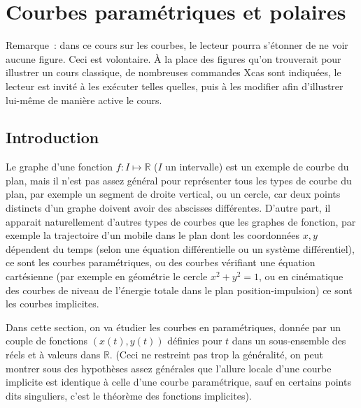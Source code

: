 \documentclass[a4paper,11pt]{article}
\newcommand{\R}{{\mathbb{R}}}
\begin{document}
\section{Courbes param\'etriques et polaires} \label{sec:courbes}
Remarque~: dans ce cours sur les courbes, le lecteur
pourra s'\'etonner de ne voir aucune figure.
Ceci est volontaire. \`A la place des figures qu'on trouverait
pour illustrer un cours classique, de nombreuses
commandes Xcas sont indiqu\'ees, le lecteur est invit\'e
\`a les ex\'ecuter telles quelles, puis \`a les modifier
afin d'illustrer lui-m\^eme de mani\`ere active le cours.

\subsection{Introduction}
Le graphe d'une fonction $f: I \mapsto \R$ ($I$ un intervalle)
est un exemple de courbe du plan, mais il
n'est pas assez g\'en\'eral pour repr\'esenter tous les types de
courbe du plan, par exemple un segment de droite vertical, ou
un cercle, car deux points distincts d'un graphe doivent avoir
des abscisses diff\'erentes. D'autre part, il apparait naturellement
d'autres types de courbes que les graphes de fonction, par exemple
la trajectoire d'un mobile dans le plan dont les coordonn\'ees $x,y$
d\'ependent du temps (selon une \'equation diff\'erentielle ou
un syst\`eme diff\'erentiel), ce sont les courbes param\'etriques,
ou des courbes v\'erifiant une
\'equation cart\'esienne (par exemple en g\'eom\'etrie
le cercle $x^2+y^2=1$, ou en cin\'ematique des courbes
de niveau de l'\'energie totale dans le plan position-impulsion)
ce sont les courbes implicites.

Dans cette section, on va \'etudier les courbes en param\'etriques,
donn\'ee par un couple de fonctions $(x(t),y(t))$ d\'efinies 
pour $t$ dans un sous-ensemble des r\'eels et \`a valeurs dans $\R$.
(Ceci ne restreint pas trop la g\'en\'eralit\'e,
on peut montrer sous des hypoth\`eses assez g\'en\'erales 
que l'allure locale d'une courbe implicite est identique \`a celle
d'une courbe param\'etrique, sauf en certains points dits singuliers,
c'est le th\'eor\`eme des fonctions implicites).
\end{document}
